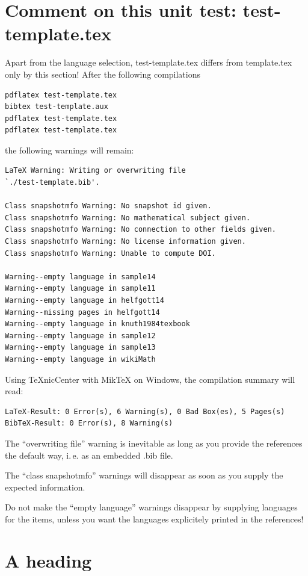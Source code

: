 \documentclass{snapshotmfo}
\begin{document}
\section{Comment on this unit test: test-template.tex}
Apart from the language selection, test-template.tex differs from template.tex only by this section!
After the following compilations
\begin{verbatim}
pdflatex test-template.tex
bibtex test-template.aux
pdflatex test-template.tex
pdflatex test-template.tex
\end{verbatim}
the following warnings will remain:
\begin{verbatim}
LaTeX Warning: Writing or overwriting file
`./test-template.bib'.

Class snapshotmfo Warning: No snapshot id given.
Class snapshotmfo Warning: No mathematical subject given.
Class snapshotmfo Warning: No connection to other fields given.
Class snapshotmfo Warning: No license information given.
Class snapshotmfo Warning: Unable to compute DOI.

Warning--empty language in sample14
Warning--empty language in sample11
Warning--empty language in helfgott14
Warning--missing pages in helfgott14
Warning--empty language in knuth1984texbook
Warning--empty language in sample12
Warning--empty language in sample13
Warning--empty language in wikiMath
\end{verbatim}

Using TeXnicCenter with MikTeX on Windows, the compilation summary will read:
\begin{verbatim}
LaTeX-Result: 0 Error(s), 6 Warning(s), 0 Bad Box(es), 5 Pages(s)
BibTeX-Result: 0 Error(s), 8 Warning(s)
\end{verbatim}

The ``overwriting file'' warning is inevitable as long as you provide the references the default
way, i.\,e. as an embedded .bib file.

The ``class snapshotmfo'' warnings will disappear as soon as you supply the expected information.

Do not make the ``empty language'' warnings disappear by supplying languages for the items,
unless you want the languages explicitely printed in the references!


\section{A heading}
\end{document}
